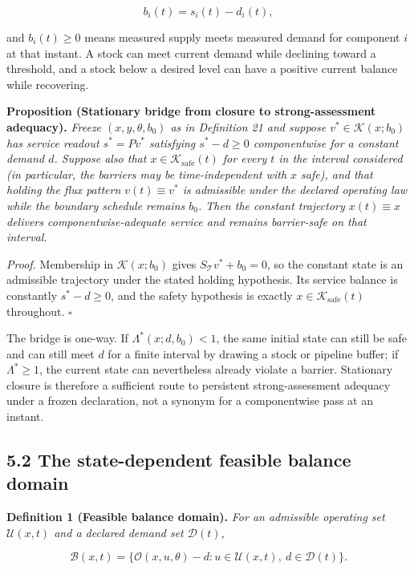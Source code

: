 \documentclass[11pt]{article}
\begin{document}
$$b_i(t) = s_i(t) - d_i(t),$$

 and \(b_i(t) \ge 0\) means measured supply meets measured demand for component \(i\) at that instant. A stock can meet current demand while declining toward a threshold, and a stock below a desired level can have a positive current balance while recovering.

\textbf{Proposition (Stationary bridge from closure to strong-assessment adequacy).} \emph{Freeze \((x,y,\theta,b_0)\) as in Definition 21 and suppose \(v^*\in\mathcal K(x;b_0)\) has service readout \(s^*=Pv^*\) satisfying \(s^*-d\ge0\) componentwise for a constant demand \(d\). Suppose also that \(x\in\mathcal K_{\mathrm{safe}}(t)\) for every \(t\) in the interval considered (in particular, the barriers may be time-independent with \(x\) safe), and that holding the flux pattern \(v(t)\equiv v^*\) is admissible under the declared operating law while the boundary schedule remains \(b_0\). Then the constant trajectory \(x(t)\equiv x\) delivers componentwise-adequate service and remains barrier-safe on that interval.}

\emph{Proof.} Membership in \(\mathcal K(x;b_0)\) gives \(S_{\mathcal{T}}v^*+b_0=0\), so the constant state is an admissible trajectory under the stated holding hypothesis. Its service balance is constantly \(s^*-d\ge0\), and the safety hypothesis is exactly \(x\in\mathcal K_{\mathrm{safe}}(t)\) throughout. \(\square\)

The bridge is one-way. If \(\Lambda^*(x;d,b_0)<1\), the same initial state can still be safe and can still meet \(d\) for a finite interval by drawing a stock or pipeline buffer; if \(\Lambda^*\ge1\), the current state can nevertheless already violate a barrier. Stationary closure is therefore a sufficient route to persistent strong-assessment adequacy under a frozen declaration, not a synonym for a componentwise pass at an instant.

\subsection*{5.2 The state-dependent feasible balance domain}\label{52-the-state-dependent-feasible-balance-domain}

\textbf{Definition 1 (Feasible balance domain).} \emph{For an admissible operating set \(\mathcal{U}(x,t)\) and a declared demand set \(\mathcal{D}(t)\),} 

$$\mathcal{B}(x,t) = \{ \mathcal{O}(x,u,\theta) - d : u \in \mathcal{U}(x,t),\ d \in \mathcal{D}(t) \}.$$
\end{document}
